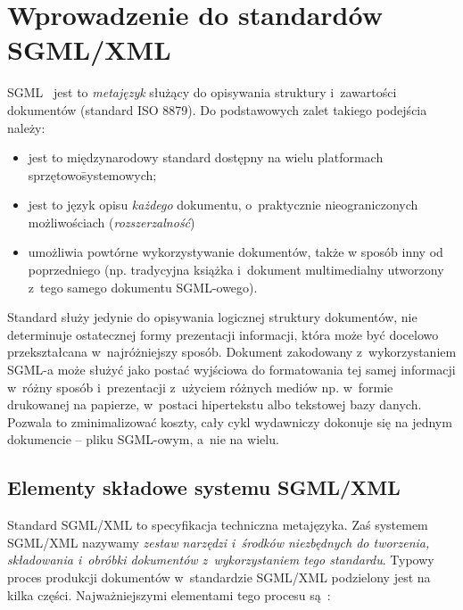 \documentclass[brudnopis,xodstep]{xmgr}
\begin{document}
\chapter{Wprowadzenie do standardów SGML/XML}

SGML~\cite{Goldfarb} jest to \emph{metajęzyk} służący do opisywania
struktury i~zawartości dokumentów (standard ISO 8879).  Do
podstawowych zalet takiego podejścia należy: 
\begin{itemize}
\item
jest to międzynarodowy
standard dostępny na wielu platformach sprzętowo\=systemowych;
\item
jest to
język opisu \emph{każdego\/} dokumentu, o~praktycznie nieograniczonych
możliwościach (\emph{rozszerzalność\/}) 
\item
umożliwia powtórne
wykorzystywanie dokumentów, także w sposób inny od poprzedniego
(np. tradycyjna książka i~dokument multimedialny utworzony z~tego
samego dokumentu SGML-owego).
\end{itemize}

Standard służy jedynie do opisywania logicznej struktury dokumentów,
nie determinuje ostatecznej formy prezentacji informacji, która może
być docelowo przekształcana w~najróżniejszy sposób. Dokument
zakodowany z~wykorzystaniem SGML-a może służyć jako postać wyjściowa
do formatowania tej samej informacji w~różny sposób i~prezentacji
z~użyciem różnych mediów np. w~formie drukowanej na papierze,
w~postaci hipertekstu albo tekstowej bazy danych. Pozwala to
zminimalizować koszty, cały cykl wydawniczy dokonuje się
na jednym dokumencie -- pliku SGML-owym, a~nie na wielu.
    
\section{Elementy składowe systemu SGML/XML}

Standard SGML/XML to specyfikacja techniczna metajęzyka. Zaś systemem
SGML/XML nazywamy \emph{zestaw narzędzi i~środków niezbędnych do
tworzenia, składowania i~obróbki dokumentów z~wykorzystaniem tego
standardu}.  Typowy proces produkcji dokumentów w~standardzie SGML/XML
podzielony jest na kilka części. Najważniejszymi elementami tego
procesu są~\cite[s.~45--47]{maler.devel}:
    
\end{document}
